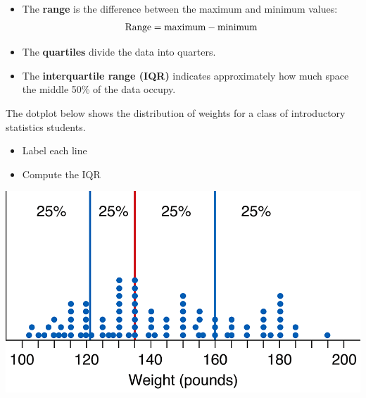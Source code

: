 \documentclass[../mathNotesPreamble]{subfiles}
\begin{document}
  \begin{defn*}
    \begin{itemize}
      \item The \textbf{range} is the difference between the maximum and minimum values:
        \[\textnormal{Range}=\textnormal{maximum}-\textnormal{minimum}\]
      \item The \textbf{quartiles} divide the data into quarters.
      \item The \textbf{interquartile range (IQR)} indicates approximately how much space the middle 50\% of the data occupy.
    \end{itemize}
  \end{defn*}
  \begin{ex*}
    The dotplot below shows the distribution of weights for a class of introductory statistics students.
    \begin{itemize}
      \item Label each line
      \item Compute the IQR
    \end{itemize}
  \end{ex*}
  \begin{center}
    \includegraphics[width=0.7\linewidth]{images/math211_figure_3p18}
  \end{center}
  \pagebreak
\end{document}
